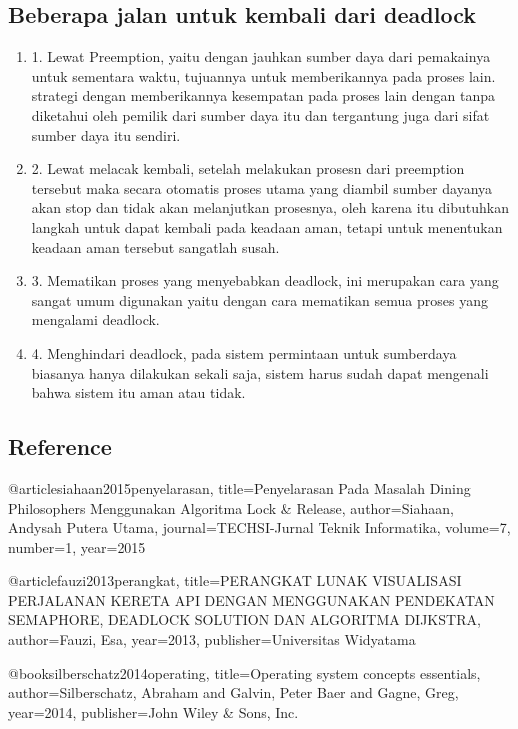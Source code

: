 \subsection {Beberapa jalan untuk kembali dari deadlock}
\begin {enumerate}
\item
1. Lewat Preemption, yaitu dengan jauhkan sumber daya dari pemakainya untuk sementara waktu, tujuannya untuk memberikannya pada proses lain. strategi dengan memberikannya kesempatan pada proses lain dengan tanpa diketahui oleh pemilik dari sumber daya itu dan tergantung juga dari sifat sumber daya itu sendiri.
\item
2. Lewat melacak kembali, setelah melakukan prosesn dari preemption tersebut maka secara otomatis proses utama yang diambil sumber dayanya akan stop dan tidak akan melanjutkan prosesnya, oleh karena itu dibutuhkan langkah untuk dapat kembali pada keadaan aman, tetapi untuk menentukan keadaan aman tersebut sangatlah susah.
\item
3. Mematikan proses yang menyebabkan deadlock, ini merupakan cara yang sangat umum digunakan yaitu dengan cara mematikan semua proses yang mengalami deadlock.
\item
4. Menghindari deadlock, pada sistem permintaan untuk sumberdaya biasanya hanya dilakukan sekali saja, sistem harus sudah dapat mengenali bahwa sistem itu aman atau tidak.
\end {enumerate}

\subsection {Reference}

@article{siahaan2015penyelarasan,
  title={Penyelarasan Pada Masalah Dining Philosophers Menggunakan Algoritma Lock \& Release},
  author={Siahaan, Andysah Putera Utama},
  journal={TECHSI-Jurnal Teknik Informatika},
  volume={7},
  number={1},
  year={2015}
}

@article{fauzi2013perangkat,
  title={PERANGKAT LUNAK VISUALISASI PERJALANAN KERETA API DENGAN MENGGUNAKAN PENDEKATAN SEMAPHORE, DEADLOCK SOLUTION DAN ALGORITMA DIJKSTRA},
  author={Fauzi, Esa},
  year={2013},
  publisher={Universitas Widyatama}
}

@book{silberschatz2014operating,
  title={Operating system concepts essentials},
  author={Silberschatz, Abraham and Galvin, Peter Baer and Gagne, Greg},
  year={2014},
  publisher={John Wiley \& Sons, Inc.}
}
